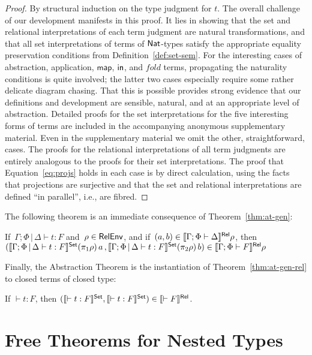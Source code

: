 \documentclass[runningheads]{llncs}
\newcommand{\map}{\mathsf{map}}
\newcommand{\fold}{\mathit{fold}}
\begin{document}
\begin{proof}
By structural induction on the type judgment for $t$. The overall
challenge of our development manifests in this proof. It lies in
showing that the set and relational interpretations of each term
judgment are natural transformations, and that all set interpretations
of terms of $\mathsf{Nat}$-types satisfy the appropriate equality preservation
conditions from Definition~\ref{def:set-sem}.  For the interesting
cases of abstraction, application, $\map$, $\mathsf{in}$, and $\fold$ terms,
propagating the naturality conditions is quite involved; the latter
two cases especially require some rather delicate diagram
chasing. That this is possible provides strong evidence that our
definitions and development are sensible, natural, and at an
appropriate level of abstraction. Detailed proofs for the set
interpretations for the five interesting forms of terms are included
in the accompanying anonymous supplementary material. Even in the
supplementary material we omit the other, straightforward, cases.  The
proofs for the relational interpretations of all term judgments are
entirely analogous to the proofs for their set interpretations. The
proof that Equation~\ref{eq:projs} holds in each case is by direct
calculation, using the facts that projections are surjective and that
the set and relational interpretations are defined ``in parallel'',
i.e., are fibred.
\end{proof}

The following theorem is an immediate consequence of
Theorem~\ref{thm:at-gen}:
\begin{theorem}\label{thm:at-gen-rel}
If \,$\Gamma; \Phi \,|\, \Delta \vdash t : F$ and \,$\rho \in \mathsf{RelEnv}$,
  and if \,$(a, b) \in \llbracket{\Gamma; \Phi \vdash \Delta}\rrbracket^{\mathsf{Rel}} \rho$,
  then \\
  $(\llbracket{\Gamma; \Phi \,|\, \Delta \vdash t : F}\rrbracket^{\mathsf{Set}} (\pi_1 \rho) \,a \, ,
      \llbracket{\Gamma; \Phi \,|\, \Delta \vdash t : F }\rrbracket^{\mathsf{Set}} (\pi_2 \rho) \,b) \in 
    \llbracket{\Gamma; \Phi \vdash F}\rrbracket^{\mathsf{Rel}} \rho$
\end{theorem}
\noindent
Finally, the Abstraction Theorem is the instantiation of
Theorem~\ref{thm:at-gen-rel} to closed terms of closed type:
\begin{theorem}\label{thm:abstraction}
If $\vdash t : F$, then $(\llbracket{\vdash t : F}\rrbracket^{\mathsf{Set}},\llbracket{\vdash t
  : F}\rrbracket^{\mathsf{Set}}) \in \llbracket{\vdash F}\rrbracket^{\mathsf{Rel}}$.
\end{theorem}

\section{Free Theorems for Nested Types}\label{sec:ftnt}
\end{document}
